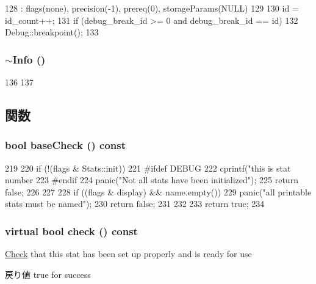 \begin{DoxyCode}
128     : flags(none), precision(-1), prereq(0), storageParams(NULL)
129 {
130     id = id_count++;
131     if (debug_break_id >= 0 and debug_break_id == id)
132         Debug::breakpoint();
133 }
\end{DoxyCode}
\hypertarget{classStats_1_1Info_a7552503ba27784c3c9d1b16c1ae042f9}{
\subsubsection[{$\sim$Info}]{\setlength{\rightskip}{0pt plus 5cm}$\sim${\bf Info} ()}}
\label{classStats_1_1Info_a7552503ba27784c3c9d1b16c1ae042f9}



\begin{DoxyCode}
136 {
137 }
\end{DoxyCode}


\subsection{関数}
\hypertarget{classStats_1_1Info_ac21d6db5b2d000383b434afba91be74b}{
\subsubsection[{baseCheck}]{\setlength{\rightskip}{0pt plus 5cm}bool baseCheck () const}}
\label{classStats_1_1Info_ac21d6db5b2d000383b434afba91be74b}



\begin{DoxyCode}
219 {
220     if (!(flags & Stats::init)) {
221 #ifdef DEBUG
222         cprintf("this is stat number %
223 #endif
224         panic("Not all stats have been initialized");
225         return false;
226     }
227 
228     if ((flags & display) && name.empty()) {
229         panic("all printable stats must be named");
230         return false;
231     }
232 
233     return true;
234 }
\end{DoxyCode}
\hypertarget{classStats_1_1Info_a8eeec53c51bc14f0ad0fe9e545a7a154}{
\subsubsection[{check}]{\setlength{\rightskip}{0pt plus 5cm}virtual bool check () const}}
\label{classStats_1_1Info_a8eeec53c51bc14f0ad0fe9e545a7a154}
\hyperlink{classCheck}{Check} that this stat has been set up properly and is ready for use \begin{DoxyReturn}{戻り値}
true for success 
\end{DoxyReturn}


